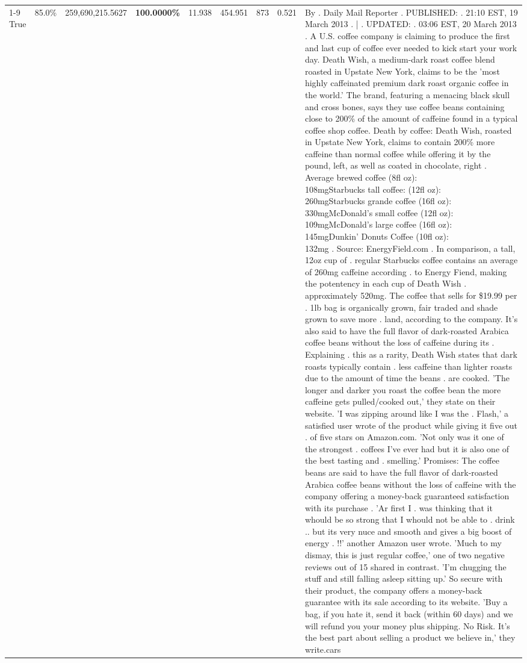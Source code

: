\begin{table}[H]
{\begin{tabular}{lllrlllll}
\cline{1-9}
True & 85.0\% & 259,690,215.5627 & \bfseries \color{red} 100.0000\% & 11.938 & 454.951 & 873 & 0.521 & By . Daily Mail Reporter . PUBLISHED: . 21:10 EST, 19 March 2013 . | . UPDATED: . 03:06 EST, 20 March 2013 . A U.S. coffee company is claiming to produce the first and last cup of coffee ever needed to kick start your work day. Death Wish, a medium-dark roast coffee blend roasted in Upstate New York, claims to be the 'most highly caffeinated premium dark roast organic coffee in the world.' The brand, featuring a menacing black skull and cross bones, says they use coffee beans containing close to 200\% of the amount of caffeine found in a typical coffee shop coffee. Death by coffee: Death Wish, roasted in Upstate New York, claims to contain 200\% more caffeine than normal coffee while offering it by the pound, left, as well as coated in chocolate, right . Average brewed coffee (8fl oz):              108mgStarbucks tall coffee: (12fl oz):                260mgStarbucks grande coffee (16fl oz):         330mgMcDonald's small coffee (12fl oz):           109mgMcDonald's large coffee (16fl oz):           145mgDunkin' Donuts Coffee (10fl oz):             132mg . Source: EnergyField.com . In comparison, a tall, 12oz cup of . regular Starbucks coffee contains an average of 260mg caffeine according . to Energy Fiend, making the potentency in each cup of Death Wish . approximately 520mg. The coffee that sells for \$19.99 per . 1lb bag is organically grown, fair traded and shade grown to save more . land, according to the company. It's also said to have the full flavor of dark-roasted Arabica coffee beans without the loss of caffeine during its . Explaining . this as a rarity, Death Wish states that dark roasts typically contain . less caffeine than lighter roasts due to the amount of time the beans . are cooked. 'The longer and darker you roast the coffee bean the more caffeine gets pulled/cooked out,' they state on their website. 'I was zipping around like I was the . Flash,' a satisfied user wrote of the product while giving it five out . of five stars on Amazon.com. 'Not only was it one of the strongest . coffees I've ever had but it is also one of the best tasting and . smelling.’ Promises: The coffee beans are said to have the full flavor of dark-roasted Arabica coffee beans without the loss of caffeine with the company offering a money-back guaranteed satisfaction with its purchase . 'Ar first I . was thinking that it whould be so strong that I whould not be able to . drink .. but its very nuce and smooth and gives a big boost of energy . !!' another Amazon user wrote. 'Much to my dismay, this is just regular coffee,' one of two negative reviews out of 15 shared in contrast. 'I'm chugging the stuff and still falling asleep sitting up.' So secure with their product, the company offers a money-back guarantee with its sale according to its website. 'Buy a bag, if you hate it, send it back (within 60 days) and we will refund you your money plus shipping. No Risk. It’s the best part about selling a product we believe in,' they write.cars \\

\end{tabular}}
\end{table}
